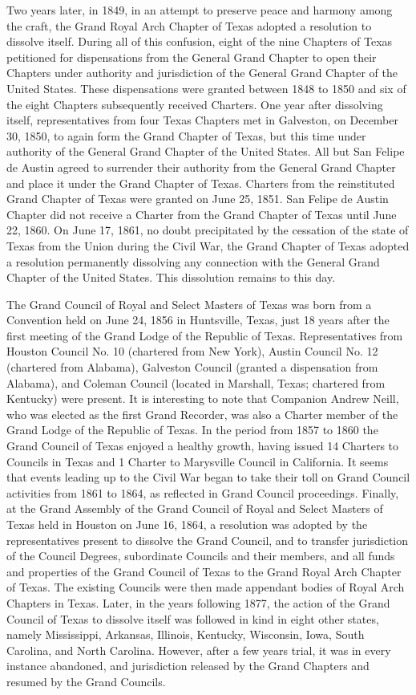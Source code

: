 \documentclass[letterpaper]{article}
\begin{document}
Two years later, in 1849, in an attempt to preserve peace and harmony among the craft, the Grand
Royal Arch Chapter of Texas adopted a resolution to dissolve itself. During all of this confusion,
eight of the nine Chapters of Texas petitioned for dispensations from the General Grand Chapter to
open their Chapters under authority and jurisdiction of the General Grand Chapter of the United
States. These dispensations were granted between 1848 to 1850 and six of the eight Chapters
subsequently received Charters. One year after dissolving itself, representatives from four Texas
Chapters met in Galveston, on December 30, 1850, to again form the Grand Chapter of Texas, but
this time under authority of the General Grand Chapter of the United States. All but San Felipe
de Austin agreed to surrender their authority from the General Grand Chapter and place it under
the Grand Chapter of Texas. Charters from the reinstituted Grand Chapter of Texas were granted
on June 25, 1851. San Felipe de Austin Chapter did not receive a Charter from the Grand Chapter
of Texas until June 22, 1860. On June 17, 1861, no doubt precipitated by the cessation of the state
of Texas from the Union during the Civil War, the Grand Chapter of Texas adopted a resolution
permanently dissolving any connection with the General Grand Chapter of the United States. This
dissolution remains to this day.

The Grand Council of Royal and Select Masters of Texas was born from a Convention held on
June 24, 1856 in Huntsville, Texas, just 18 years after the first meeting of the Grand Lodge of
the Republic of Texas. Representatives from Houston Council No. 10 (chartered from New York),
Austin Council No. 12 (chartered from Alabama), Galveston Council (granted a dispensation
from Alabama), and Coleman Council (located in Marshall, Texas; chartered from Kentucky) were
present. It is interesting to note that Companion Andrew Neill, who was elected as the first Grand
Recorder, was also a Charter member of the Grand Lodge of the Republic of Texas. In the period
from 1857 to 1860 the Grand Council of Texas enjoyed a healthy growth, having issued 14 Charters
to Councils in Texas and 1 Charter to Marysville Council in California. It seems that events
leading up to the Civil War began to take their toll on Grand Council activities from 1861 to
1864, as reflected in Grand Council proceedings. Finally, at the Grand Assembly of the Grand Council of Royal and Select Masters of Texas held in Houston on June 16, 1864, a resolution was
adopted by the representatives present to dissolve the Grand Council, and to transfer jurisdiction
of the Council Degrees, subordinate Councils and their members, and all funds and properties of
the Grand Council of Texas to the Grand Royal Arch Chapter of Texas. The existing Councils
were then made appendant bodies of Royal Arch Chapters in Texas. Later, in the years following
1877, the action of the Grand Council of Texas to dissolve itself was followed in kind in eight
other states, namely Mississippi, Arkansas, Illinois, Kentucky, Wisconsin, Iowa, South Carolina,
and North Carolina. However, after a few years trial, it was in every instance abandoned, and
jurisdiction released by the Grand Chapters and resumed by the Grand Councils.
\end{document}
